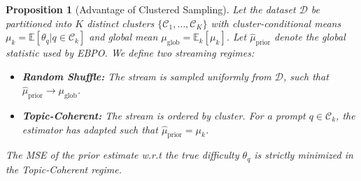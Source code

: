 \documentclass{article}
\theoremstyle{plain}
\newtheorem{proposition}[theorem]{Proposition}
\theoremstyle{definition}
\theoremstyle{remark}
\begin{document}

\begin{proposition}[Advantage of Clustered Sampling]
\label{prop:clustering}
Let the dataset $\mathcal{D}$ be partitioned into $K$ distinct clusters $\{\mathcal{C}_1, \dots, \mathcal{C}_K\}$ with cluster-conditional means $\mu_k = \mathbb{E}[\theta_q | q \in \mathcal{C}_k]$ and global mean $\mu_{\text{glob}}=\mathbb{E}_k[\mu_k]$. Let $\hat{\mu}_{\text{prior}}$ denote the global statistic used by EBPO. We define two streaming regimes:
\begin{itemize}
    \item \textbf{Random Shuffle:} The stream is sampled uniformly from $\mathcal{D}$, such that $\hat{\mu}_{\text{prior}} \!\to\! \mu_{\text{glob}}$.
    \item \textbf{Topic-Coherent:} The stream is ordered by cluster. For a prompt $q \in \mathcal{C}_k$, the estimator has adapted such that $\hat{\mu}_{\text{prior}} = \mu_k$.
\end{itemize}
The MSE of the prior estimate w.r.t the true difficulty $\theta_q$ is strictly minimized in the Topic-Coherent regime.
\end{proposition}
\end{document}
